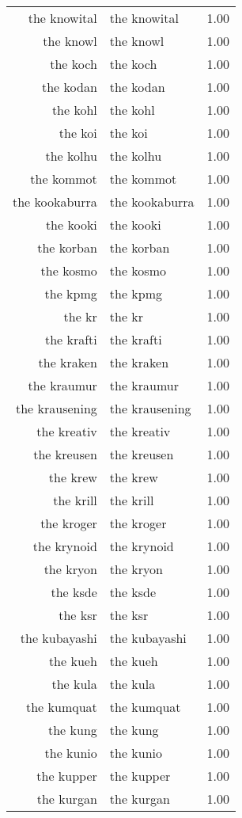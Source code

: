 \begin{table}[ht]
\begin{tabular}{rlr}
  the knowital & the knowital & 1.00 \\ 
  the knowl & the knowl & 1.00 \\ 
  the koch & the koch & 1.00 \\ 
  the kodan & the kodan & 1.00 \\ 
  the kohl & the kohl & 1.00 \\ 
  the koi & the koi & 1.00 \\ 
  the kolhu & the kolhu & 1.00 \\ 
  the kommot & the kommot & 1.00 \\ 
  the kookaburra & the kookaburra & 1.00 \\ 
  the kooki & the kooki & 1.00 \\ 
  the korban & the korban & 1.00 \\ 
  the kosmo & the kosmo & 1.00 \\ 
  the kpmg & the kpmg & 1.00 \\ 
  the kr & the kr & 1.00 \\ 
  the krafti & the krafti & 1.00 \\ 
  the kraken & the kraken & 1.00 \\ 
  the kraumur & the kraumur & 1.00 \\ 
  the krausening & the krausening & 1.00 \\ 
  the kreativ & the kreativ & 1.00 \\ 
  the kreusen & the kreusen & 1.00 \\ 
  the krew & the krew & 1.00 \\ 
  the krill & the krill & 1.00 \\ 
  the kroger & the kroger & 1.00 \\ 
  the krynoid & the krynoid & 1.00 \\ 
  the kryon & the kryon & 1.00 \\ 
  the ksde & the ksde & 1.00 \\ 
  the ksr & the ksr & 1.00 \\ 
  the kubayashi & the kubayashi & 1.00 \\ 
  the kueh & the kueh & 1.00 \\ 
  the kula & the kula & 1.00 \\ 
  the kumquat & the kumquat & 1.00 \\ 
  the kung & the kung & 1.00 \\ 
  the kunio & the kunio & 1.00 \\ 
  the kupper & the kupper & 1.00 \\ 
  the kurgan & the kurgan & 1.00 \\ 

\end{tabular}
\end{table}
